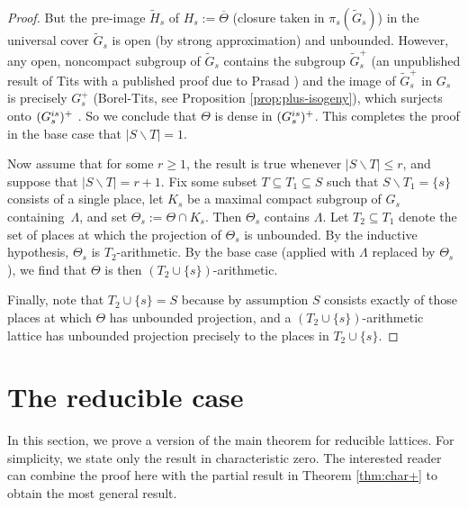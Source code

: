 \documentclass[11pt]{article}
\numberwithin{equation}{section}\providecommand{\llangle}{\langle\!\langle}\providecommand{\rrangle}{\rangle\!\rangle}\providecommand{\Asterisk}{\ast}
\let\bs\backslash
\theoremstyle{definition}
\begin{document}
\begin{proof}
But the pre-image $\widetilde{H}_s$ of $H_s:=\overline{\Theta}$ (closure taken in $\pi_s(\widetilde{G}_s)$) in the universal cover $\widetilde{G}_s$ is open (by strong approximation) and unbounded. However, any open, noncompact subgroup of $\widetilde{G}_s$ contains the subgroup $\widetilde{G}_s^+$ (an unpublished result of Tits with a published proof due to Prasad \cite{prasad-tits}) and the image of $\widetilde{G}_s^+$ in $G_s$ is precisely $G_s^+$ (Borel-Tits, see Proposition \ref{prop:plus-isogeny}), which surjects onto $(G_s^{\textup{is}})^+$ . So we conclude that $\Theta$ is dense in $(G_s^{\textup{is}})^+$. This completes the proof in the base case that $|S\bs T|=1$.

Now assume that for some $r\geq 1$, the result is true whenever $|S\bs T|\leq r$, and suppose that $|S\bs T|=r+1$. Fix some subset $T\subseteq T_1\subseteq S$ such that $S\bs T_1 = \{s\}$ consists of a single place, let $K_s$ be a maximal compact subgroup of $G_s$ containing~$\Lambda$, and set $\Theta_s:=\Theta\cap K_s$. Then $\Theta_s$ contains $\Lambda$. Let $T_2\subseteq T_1$ denote the set of places at which the projection of $\Theta_s$ is unbounded. By the inductive hypothesis, $\Theta_s$ is $T_2$\nobreakdash-arith\-metic. By the base case (applied with $\Lambda$ replaced by $\Theta_s$), we find that $\Theta$ is then $(T_2\cup\{s\})$-arithmetic.

Finally, note that $T_2\cup\{s\}=S$ because by assumption $S$ consists exactly of those places at which $\Theta$ has unbounded projection, and a $(T_2\cup \{s\})$-arithmetic lattice has unbounded projection precisely to the places in $T_2\cup\{s\}$.\end{proof}

\section{The reducible case} \label{sec:reducible}
In this section, we prove a version of the main theorem for reducible lattices. For simplicity, we state only the result in characteristic zero. The interested reader can combine the proof here with the partial result in Theorem \ref{thm:char+} to obtain the most general result.
\end{document}
